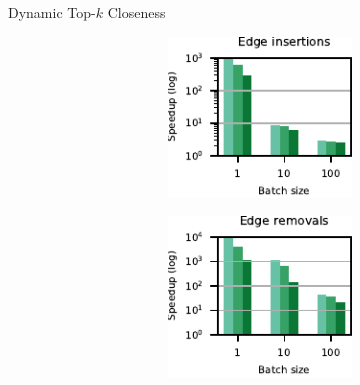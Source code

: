 \documentclass[10pt,titlepage,english,presentation]{beamer}
\begin{document}
\begin{frame}[t]{Dynamic Top-$k$ Closeness}
\begin{figure}
\begin{subfigure}[t]{\textwidth}
\begin{subfigure}[t]{.5\textwidth}
\end{subfigure}\hfill
\begin{subfigure}[t]{.5\textwidth}
\caption*{\scriptsize Road networks}
\begin{subfigure}[t]{.5\textwidth}
\centering
\includegraphics[width=.9\textwidth]{../sources/plots/dyn-topk/speedup-undirected-high-diameter-addition.pdf}
\end{subfigure}\hfill
\begin{subfigure}[t]{.5\textwidth}
\centering
\includegraphics[width=.9\textwidth]{../sources/plots/dyn-topk/speedup-undirected-high-diameter-removal.pdf}
\end{subfigure}
\end{subfigure}
\end{subfigure}
\end{figure}


\end{frame}
\end{document}
